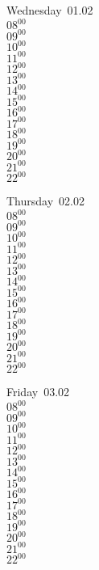 \documentclass[11pt,a4paper]{book}\usepackage[]{graphicx}\usepackage[]{color}
\begin{document}
\begin{weekdaybox}
  Wednesday~01.02\\
  { 
  \vfill
  $08^{00}$\\
$09^{00}$\\
$10^{00}$\\
$11^{00}$\\
$12^{00}$\\
$13^{00}$\\
$14^{00}$\\
$15^{00}$\\
$16^{00}$\\
$17^{00}$\\
$18^{00}$\\
$19^{00}$\\
$20^{00}$\\
$21^{00}$\\
$22^{00}$\\
  }
\end{weekdaybox}
\clearpage
\begin{headerbox}
\end{headerbox}
\begin{weekdaybox}
  Thursday~02.02\\
  { 
  \vfill
  $08^{00}$\\
$09^{00}$\\
$10^{00}$\\
$11^{00}$\\
$12^{00}$\\
$13^{00}$\\
$14^{00}$\\
$15^{00}$\\
$16^{00}$\\
$17^{00}$\\
$18^{00}$\\
$19^{00}$\\
$20^{00}$\\
$21^{00}$\\
$22^{00}$\\
  }
\end{weekdaybox} 
\begin{weekdaybox}
  Friday~03.02\\
  { 
  \vfill
  $08^{00}$\\
$09^{00}$\\
$10^{00}$\\
$11^{00}$\\
$12^{00}$\\
$13^{00}$\\
$14^{00}$\\
$15^{00}$\\
$16^{00}$\\
$17^{00}$\\
$18^{00}$\\
$19^{00}$\\
$20^{00}$\\
$21^{00}$\\
$22^{00}$\\
  }
\end{weekdaybox}
\end{document}
